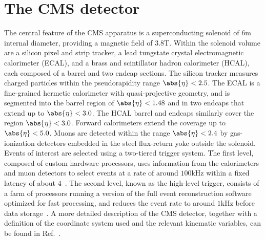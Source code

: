 \section{The CMS detector}
\label{sec:detector}

The central feature of the CMS apparatus is a superconducting solenoid of $6$\unit{m} internal diameter, 
providing a magnetic field of $3.8$\unit{T}. 
Within the solenoid volume are a silicon pixel and strip tracker, 
a lead tungstate crystal electromagnetic calorimeter (ECAL), 
and a brass and scintillator hadron calorimeter (HCAL), 
each composed of a barrel and two endcap sections.
The silicon tracker measures charged particles within the pseudorapidity range $\abs{\eta} < 2.5$. 
The ECAL is a fine-grained hermetic calorimeter with quasi-projective geometry,
and is segmented into the barrel region of $\abs{\eta} < 1.48$ and in two endcaps that extend up to $\abs{\eta} < 3.0$.
The HCAL barrel and endcaps similarly cover the region $\abs{\eta} < 3.0$.
Forward calorimeters extend the coverage up to $\abs{\eta} < 5.0$.
Muons are detected within the range $\abs{\eta} < 2.4$ 
by gas-ionization detectors embedded in the steel flux-return yoke outside the solenoid.
Events of interest are selected using a two-tiered trigger system. 
The first level, composed of custom hardware processors, uses information from the calorimeters and muon detectors 
to select events at a rate of around $100$\unit{kHz} within a fixed latency of about $4$\mus~\cite{Sirunyan:2020zal}. 
The second level, known as the high-level trigger, 
consists of a farm of processors running a version of the full event reconstruction software optimized for fast processing, 
and reduces the event rate to around $1$\unit{kHz} before data storage~\cite{Khachatryan:2016bia}. 
A more detailed description of the CMS detector, 
together with a definition of the coordinate system used and the relevant kinematic variables, can be found in Ref.~\cite{Chatrchyan:2008zzk}. 
